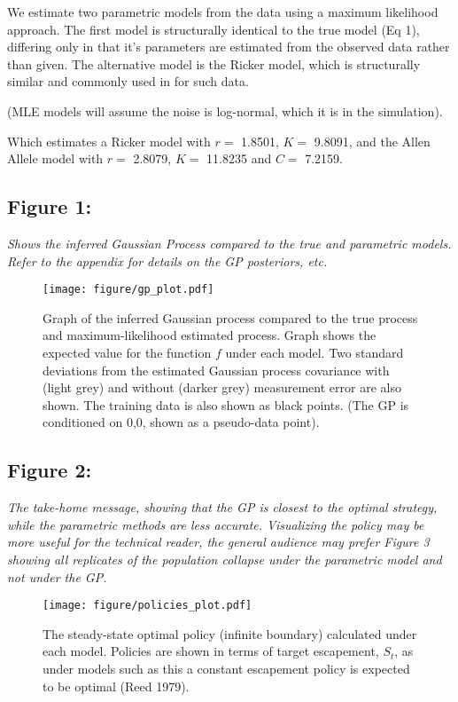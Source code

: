 \documentclass[author-year, review]{elsarticle} %
\makeatletter
\def\maxwidth{\ifdim\Gin@nat@width>\linewidth\linewidth
\else\Gin@nat@width\fi}
\let\Oldincludegraphics\includegraphics
\renewcommand{\includegraphics}[1]{\Oldincludegraphics[width=\maxwidth]{#1}}
\makeatother
\begin{document}
We estimate two parametric models from the data using a maximum
likelihood approach. The first model is structurally identical to the
true model (Eq 1), differing only in that it's parameters are estimated
from the observed data rather than given. The alternative model is the
Ricker model, which is structurally similar and commonly used in for
such data.

(MLE models will assume the noise is log-normal, which it is in the
simulation).

Which estimates a Ricker model with $r =$ 1.8501, $K =$ 9.8091, and the
Allen Allele model with $r =$ 2.8079, $K =$ 11.8235 and $C =$ 7.2159.

\subsection{Figure 1:}

\emph{Shows the inferred Gaussian Process compared to the true and
parametric models. Refer to the appendix for details on the GP
posteriors, etc.}

\begin{figure}[htbp]
\centering
\texttt{[image: figure/gp\_plot.pdf]}
\caption{Graph of the inferred Gaussian process compared to the true
process and maximum-likelihood estimated process. Graph shows the
expected value for the function $f$ under each model. Two standard
deviations from the estimated Gaussian process covariance with (light
grey) and without (darker grey) measurement error are also shown. The
training data is also shown as black points. (The GP is conditioned on
0,0, shown as a pseudo-data point).}
\end{figure}

\subsection{Figure 2:}

\emph{The take-home message, showing that the GP is closest to the
optimal strategy, while the parametric methods are less accurate.
Visualizing the policy may be more useful for the technical reader, the
general audience may prefer Figure 3 showing all replicates of the
population collapse under the parametric model and not under the GP.}

\begin{figure}[htbp]
\centering
\texttt{[image: figure/policies\_plot.pdf]}
\caption{The steady-state optimal policy (infinite boundary) calculated
under each model. Policies are shown in terms of target escapement,
$S_t$, as under models such as this a constant escapement policy is
expected to be optimal (Reed 1979).}
\end{figure}
\end{document}
